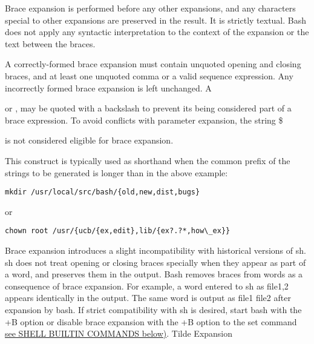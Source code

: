 Brace expansion is performed before any other expansions, and any characters special to other expansions are preserved in the result. It is strictly textual. Bash does not apply any syntactic interpretation to the context of the expansion or the text between the braces.

A correctly-formed brace expansion must contain unquoted opening and closing braces, and at least one unquoted comma or a valid sequence expression. Any incorrectly formed brace expansion is left unchanged. A { or , may be quoted with a backslash to prevent its being considered part of a brace expression. To avoid conflicts with parameter expansion, the string \${ is not considered eligible for brace expansion.

This construct is typically used as shorthand when the common prefix of the strings to be generated is longer than in the above example:

\begin{lstlisting}
mkdir /usr/local/src/bash/{old,new,dist,bugs}
\end{lstlisting}

or

\begin{lstlisting}
chown root /usr/{ucb/{ex,edit},lib/{ex?.?*,how\_ex}}
\end{lstlisting}

Brace expansion introduces a slight incompatibility with historical versions of sh. sh does not treat opening or closing braces specially when they appear as part of a word, and preserves them in the output. Bash removes braces from words as a consequence of brace expansion. For example, a word entered to sh as file{1,2} appears identically in the output. The same word is output as file1 file2 after expansion by bash. If strict compatibility with sh is desired, start bash with the +B option or disable brace expansion with the +B option to the set command \hyperref[sec:shellbuiltincommands]{see SHELL BUILTIN COMMANDS below)}.
Tilde Expansion

}}
